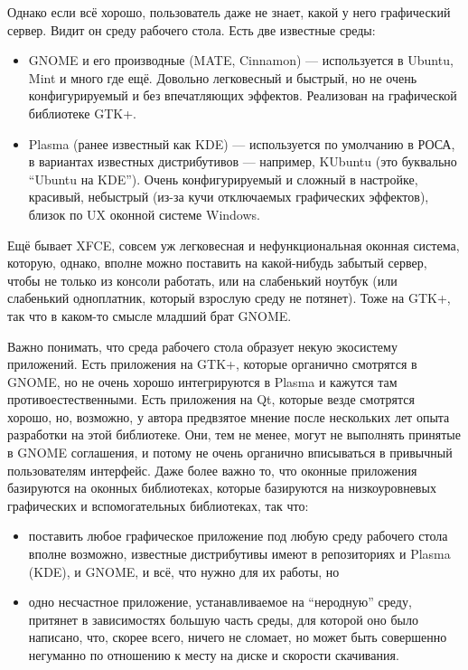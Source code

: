 \documentclass{../../text-style}
\begin{document}
Однако если всё хорошо, пользователь даже не знает, какой у него графический сервер.
Видит он среду рабочего стола.
Есть две известные среды:

\begin{itemize}
    \item GNOME и его производные (MATE, Cinnamon) --- используется в Ubuntu, Mint и много где ещё. Довольно легковесный и быстрый, но не очень конфигурируемый и без впечатляющих эффектов. Реализован на графической библиотеке GTK+.
    \item Plasma (ранее известный как KDE) --- используется по умолчанию в РОСА, в вариантах известных дистрибутивов --- например, KUbuntu (это буквально \enquote{Ubuntu на KDE}). Очень конфигурируемый и сложный в настройке, красивый, небыстрый (из-за кучи отключаемых графических эффектов), близок по UX оконной системе Windows.
\end{itemize}

Ещё бывает XFCE, совсем уж легковесная и нефункциональная оконная система, которую, однако, вполне можно поставить на какой-нибудь забытый сервер, чтобы не только из консоли работать, или на слабенький ноутбук (или слабенький одноплатник, который взрослую среду не потянет). 
Тоже на GTK+, так что в каком-то смысле младший брат GNOME.

Важно понимать, что среда рабочего стола образует некую экосистему приложений.
Есть приложения на GTK+, которые органично смотрятся в GNOME, но не очень хорошо интегрируются в Plasma и кажутся там противоестественными.
Есть приложения на Qt, которые везде смотрятся хорошо, но, возможно, у автора предвзятое мнение после нескольких лет опыта разработки на этой библиотеке.
Они, тем не менее, могут не выполнять принятые в GNOME соглашения, и потому не очень органично вписываться в привычный пользователям интерфейс.
Даже более важно то, что оконные приложения базируются на оконных библиотеках, которые базируются на низкоуровневых графических и вспомогательных библиотеках, так что:

\begin{itemize}
    \item поставить любое графическое приложение под любую среду рабочего стола вполне возможно, известные дистрибутивы имеют в репозиториях и Plasma (KDE), и GNOME, и всё, что нужно для их работы, но
    \item одно несчастное приложение, устанавливаемое на \enquote{неродную} среду, притянет в зависимостях большую часть среды, для которой оно было написано, что, скорее всего, ничего не сломает, но может быть совершенно негуманно по отношению к месту на диске и скорости скачивания.
\end{itemize}
\end{document}
